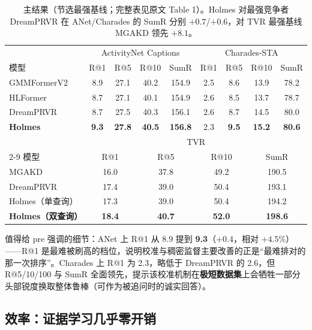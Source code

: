\documentclass[11pt,a4paper,UTF8,fontset=windows]{ctexart}
\newcommand{\term}[1]{\textbf{#1}}
\begin{document}
\begin{table}[h]
\centering
\small
\begin{tabular}{@{}lcccc|cccc@{}}
\toprule
 & \multicolumn{4}{c|}{ActivityNet Captions} & \multicolumn{4}{c}{Charades-STA} \\
模型 & R@1 & R@5 & R@10 & SumR & R@1 & R@5 & R@10 & SumR \\
\midrule
GMMFormerV2 & 8.9 & 27.1 & 40.2 & 154.9 & 2.5 & 8.6 & 13.9 & 78.2 \\
HLFormer & 8.7 & 27.1 & 40.1 & 154.9 & 2.6 & 8.5 & 13.7 & 78.7 \\
DreamPRVR & 8.7 & 27.5 & 40.3 & 156.1 & 2.6 & 8.7 & 14.5 & 80.0 \\
\textbf{Holmes} & \textbf{9.3} & \textbf{27.8} & \textbf{40.5} & \textbf{156.8} & 2.3 & \textbf{9.5} & \textbf{15.2} & \textbf{80.6} \\
\midrule
 & \multicolumn{8}{c}{TVR} \\
\cmidrule(lr){2-9}
模型 & \multicolumn{2}{c}{R@1} & \multicolumn{2}{c}{R@5} & \multicolumn{2}{c}{R@10} & \multicolumn{2}{c}{SumR} \\
\midrule
MGAKD & \multicolumn{2}{c}{16.0} & \multicolumn{2}{c}{37.8} & \multicolumn{2}{c}{49.2} & \multicolumn{2}{c}{190.5} \\
DreamPRVR & \multicolumn{2}{c}{17.4} & \multicolumn{2}{c}{39.0} & \multicolumn{2}{c}{50.4} & \multicolumn{2}{c}{193.1} \\
Holmes（单查询） & \multicolumn{2}{c}{17.3} & \multicolumn{2}{c}{39.0} & \multicolumn{2}{c}{50.4} & \multicolumn{2}{c}{194.2} \\
\textbf{Holmes（双查询）} & \multicolumn{2}{c}{\textbf{18.4}} & \multicolumn{2}{c}{\textbf{40.7}} & \multicolumn{2}{c}{\textbf{52.0}} & \multicolumn{2}{c}{\textbf{198.6}} \\
\bottomrule
\end{tabular}
\caption{主结果（节选最强基线；完整表见原文 Table 1）。Holmes 对最强竞争者 DreamPRVR 在 ANet/Charades 的 SumR 分别 $+0.7$/$+0.6$，对 TVR 最强基线 MGAKD 领先 $+8.1$。}
\end{table}

值得给 pre 强调的细节：ANet 上 R@1 从 8.9 提到 \textbf{9.3}（$+0.4$，相对 $+4.5\%$）——R@1 是最难被刷高的档位，说明校准与稠密监督主要改善的正是“最难排对的那一次排序”。Charades 上 R@1 为 2.3，略低于 DreamPRVR 的 2.6，但 R@5/10/100 与 SumR 全面领先，提示该校准机制在\term{极短数据集}上会牺牲一部分头部锐度换取整体鲁棒（可作为被追问时的诚实回答）。

\subsection{效率：证据学习几乎零开销}
\end{document}
